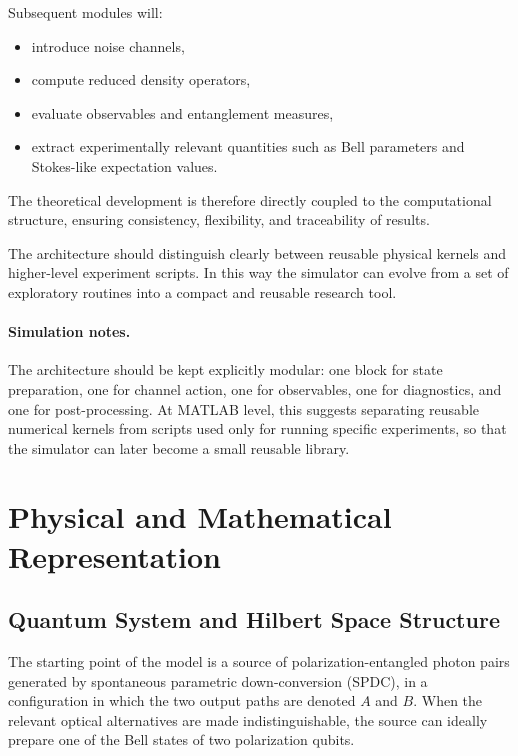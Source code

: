 \documentclass[a4paper]{article}
\begin{document}
Subsequent modules will:
\begin{itemize}
    \item introduce noise channels,
    \item compute reduced density operators,
    \item evaluate observables and entanglement measures,
    \item extract experimentally relevant quantities such as Bell parameters and Stokes-like expectation values.
\end{itemize}

The theoretical development is therefore directly coupled to the computational structure, ensuring consistency, flexibility, and traceability of results.

The architecture should distinguish clearly between reusable physical kernels and higher-level experiment scripts. In this way the simulator can evolve from a set of exploratory routines into a compact and reusable research tool.

\paragraph{Simulation notes.}
The architecture should be kept explicitly modular: one block for state preparation, one for channel action, one for observables, one for diagnostics, and one for post-processing. At MATLAB level, this suggests separating reusable numerical kernels from scripts used only for running specific experiments, so that the simulator can later become a small reusable library.

\section{Physical and Mathematical Representation}

\subsection{Quantum System and Hilbert Space Structure}

The starting point of the model is a source of polarization-entangled photon pairs generated by spontaneous parametric down-conversion (SPDC), in a configuration in which the two output paths are denoted \(A\) and \(B\). When the relevant optical alternatives are made indistinguishable, the source can ideally prepare one of the Bell states of two polarization qubits.
\end{document}
